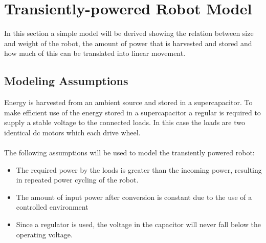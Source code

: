 \section{Transiently-powered Robot Model}
\label{sec:transient_model}

In this section a simple model will be derived showing the relation between size and weight of the robot, the amount of power that is harvested and stored and how much of this can be translated into linear movement.

\subsection{Modeling Assumptions}

Energy is harvested from an ambient source and stored in a supercapacitor.
To make efficient use of the energy stored in a supercapacitor a regular is required to supply a stable voltage to the connected loads.
In this case the loads are two identical dc motors which each drive wheel. \\
\\ \noindent
The following assumptions will be used to model the transiently powered robot:
\begin{itemize}
	\item The required power by the loads is greater than the incoming power, resulting in repeated power cycling of the robot.
	\item The amount of input power after conversion is constant due to the use of a controlled environment
	\item Since a regulator is used, the voltage in the capacitor will never fall below the operating voltage.
\end{itemize}












